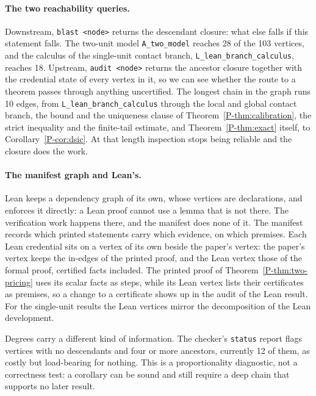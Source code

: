 \documentclass[11pt]{article}
\newcommand{\pref}[1]{\ref*{P-#1}}
\newcommand{\lean}[1]{\begingroup\def\_{\textunderscore\allowbreak}\texttt{\small #1}\endgroup}
\begin{document}
\paragraph{The two reachability queries.}
Downstream, \lean{blast <node>} returns the descendant closure: what else
falls if this statement falls. The two-unit model
\texttt{A\_two\_model} reaches 28 of the 103 vertices, and the calculus of
the single-unit contact branch, \texttt{L\_lean\_branch\_calculus}, reaches
18. Upstream, \lean{audit <node>} returns the ancestor closure together with
the credential state of every vertex in it, so we can see whether the route
to a theorem passes through anything uncertified. The longest chain in the
graph runs 10 edges, from \texttt{L\_lean\_branch\_calculus} through the
local and global contact branch, the bound and the uniqueness clause of
Theorem~\pref{thm:calibration}, the strict inequality and the finite-tail
estimate, and Theorem~\pref{thm:exact} itself, to
Corollary~\pref{cor:dsic}. At that length inspection stops being reliable
and the closure does the work.

\paragraph{The manifest graph and Lean's.}
Lean keeps a dependency graph of its own, whose vertices are declarations,
and enforces it directly: a Lean proof cannot use a lemma that is not
there. The verification work happens there, and the manifest does none of
it. The manifest records which printed statements carry which evidence, on
which premises. Each Lean credential sits on a vertex of its own beside the
paper's vertex: the paper's vertex keeps the in-edges of the printed proof,
and the Lean vertex those of the formal proof, certified facts included.
The printed proof of Theorem~\pref{thm:two-pricing} uses its scalar facts as
steps, while its Lean vertex lists their certificates as premises, so a
change to a certificate shows up in the audit of the Lean result. For the
single-unit results the Lean vertices mirror the decomposition of the Lean
development.

Degrees carry a different kind of information. The checker's
\lean{status} report flags vertices with no descendants and four or more
ancestors, currently 12 of them, as costly but load-bearing for nothing.
This is a proportionality diagnostic, not a correctness test: a corollary
can be sound and still require a deep chain that supports no later result.

\FloatBarrier
\end{document}
